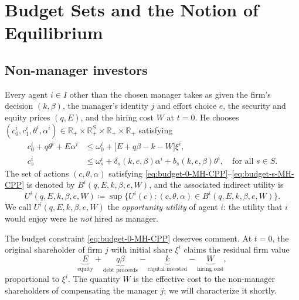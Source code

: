 \documentclass[11pt,a4paper,oneside]{book}
\def\R{\mathbb{R}}
\def\leq{\leqslant}
\theoremstyle{plain}
\theoremstyle{definition}
\theoremstyle{remark}
\numberwithin{equation}{chapter}
\begin{document}
\section{Budget Sets and the Notion of Equilibrium}
\label{sec:MH-CPP-budgets}

\subsection{Non-manager investors}

Every agent $i \in I$ other than the chosen manager takes as given the firm's decision $(k, \beta)$, the manager's identity $j$ and effort choice $e$, the security and equity prices $(q, E)$, and the hiring cost $W$ at $t=0$.
He chooses $(c^i_0, c^i_1, \theta^i, \alpha^i) \in \R_+ \times \R_+^S \times \R_+ \times \R_+$ satisfying
\begin{align}
  c^i_0 + q \theta^i + E \alpha^i
  &\leq \omega^i_0 + \bigl[ E + q \beta - k - W \bigr] \xi^i,
  \label{eq:budget-0-MH-CPP}\\[2pt]
  c^i_s
  &\leq \omega^i_s + \delta_s(k, e, \beta) \alpha^i + b_s(k, e, \beta) \theta^i, \quad \text{for all $s\in S$}.
  \label{eq:budget-s-MH-CPP}
\end{align}
The set of actions $(c, \theta, \alpha)$ satisfying \eqref{eq:budget-0-MH-CPP}--\eqref{eq:budget-s-MH-CPP} is denoted by $B^i(q, E, k, \beta, e, W)$, and the associated indirect utility is
\begin{equation}\label{eq:opportunity-utility}
  U^i(q, E, k, \beta, e, W)
  \coloneqq \sup \bigl\{ U^i(c) \colon (c, \theta, \alpha) \in B^i(q, E, k, \beta, e, W) \bigr\}.
\end{equation}
We call $U^i(q, E, k, \beta, e, W)$ the \emph{opportunity utility} of agent $i$: the utility that $i$ would enjoy were he \emph{not} hired as manager.

The budget constraint \eqref{eq:budget-0-MH-CPP} deserves comment.
At $t=0$, the original shareholder of firm $j$ with initial share $\xi^i$ claims the residual firm value
\begin{equation*}
  \underbrace{E}_{\text{equity}} + \underbrace{q \beta}_{\text{debt proceeds}} - \underbrace{k}_{\text{capital invested}} - \underbrace{W}_{\text{hiring cost}},
\end{equation*}
proportional to $\xi^i$.
The quantity $W$ is the effective cost to the non-manager shareholders of compensating the manager $j$; we will characterize it shortly.
\end{document}
